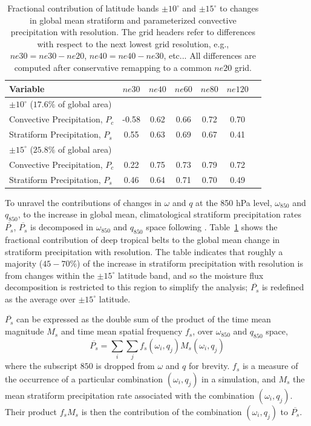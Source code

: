 \documentclass[alpha-refs]{wiley-article}
\begin{document}
 \begin{table}
 \caption{Fractional contribution of latitude bands $\pm 10^{\circ}$ and $\pm 15^{\circ}$ to changes in global mean stratiform and parameterized convective precipitation with resolution. The grid headers refer to differences with respect to the next lowest grid resolution, e.g., $ne30 = ne30-ne20$, $ne40=ne40-ne30$, etc... All differences are computed after conservative remapping to a common $ne20$ grid.}
 \centering
 \scriptsize
 \begin{tabular}{lcccccc}
   \hline
   Variable & $ne30$ & $ne40$ & $ne60$ & $ne80$ & $ne120$ \\ 
   \hline
   $\pm 10^{\circ}$ ($17.6\%$ of global area) \\
   Convective Precipitation, $P_c$ & -0.58 & 0.62 & 0.66 & 0.72 & 0.70 \\
   Stratiform Precipitation, $P_s$ & 0.55 & 0.63 & 0.69 & 0.67 & 0.41 \\ 
   \hline
   $\pm 15^{\circ}$ ($25.8\%$ of global area) \\
   Convective Precipitation, $P_c$ & 0.22 & 0.75 & 0.73 & 0.79 & 0.72 \\
   Stratiform Precipitation, $P_s$ & 0.46 & 0.64 & 0.71 & 0.70 & 0.49 \\      
 \hline
 \end{tabular}
 \label{tbl:table2}
 \end{table}

To unravel the contributions of changes in $\omega$ and $q$ at the 850 hPa level, $\omega_{850}$ and $q_{850}$, to the increase in global mean, climatological stratiform precipitation rates $\overline{P_s}$, $\overline{P_s}$ is decomposed in $\omega_{850}$ and $q_{850}$ space following \cite{TETAL2018CD}. Table~\ref{tbl:table2} shows the fractional contribution of deep tropical belts to the global mean change in stratiform precipitation with resolution. The table indicates that roughly a majority ($45-70 \%$) of the increase in stratiform precipitation with resolution is from changes within the $\pm 15^{\circ}$ latitude band, and so the moisture flux decomposition is restricted to this region to simplify the analysis; $\overline{P_s}$ is redefined as the average over $\pm 15^{\circ}$ latitude. 

$\overline{P_s}$ can be expressed as the double sum of the product of the time mean magnitude $M_s$ and time mean spatial frequency $f_s$, over $\omega_{850}$ and $q_{850}$ space,
\begin{equation}
\overline{P_{s}} = \sum_i \sum_j f_s \left( \omega_i , q_j \right) M_s \left( \omega_i , q_j \right) \label{eq:pdecomp}
\end{equation}
where the subscript $850$ is dropped from $\omega$ and $q$ for brevity. $f_s$ is a measure of the occurrence of a particular combination $\left( \omega_i , q_j \right)$ in a simulation, and $M_s$ the mean stratiform precipitation rate associated with the combination $\left( \omega_i , q_j \right)$. Their product $f_s M_s$ is then the contribution of the combination $\left( \omega_i , q_j \right)$ to $\overline{P_s}$.
\end{document}
